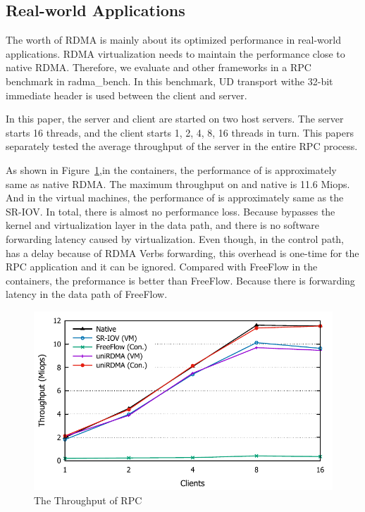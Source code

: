 \subsection{Real-world Applications}

The worth of RDMA is mainly about its optimized performance in real-world applications. RDMA virtualization needs to maintain the performance close to native RDMA. Therefore, we evaluate \sys and other frameworks in a RPC benchmark in radma\_bench\cite{rbench}. In this benchmark, UD transport withe 32-bit immediate header is used between the client and server.

In this paper, the server and client are started on two host servers. The server starts 16 threads, and the client starts 1, 2, 4, 8, 16 threads in turn. This papers separately tested the average throughput of the server in the entire RPC process.

As shown in Figure~\ref{fig:rpc},in the containers, the performance of \sys is approximately same as native RDMA. The
maximum throughput on \sys and native is 11.6 Miops. And in the virtual machines, the performance of \sys is approximately same as the SR-IOV. In total, there is almost no performance loss. Because \sys bypasses the kernel and virtualization layer in the data path, and there is no software forwarding latency caused by virtualization. Even though, in the control path, \sys has a delay because of RDMA Verbs forwarding, this overhead is one-time for the RPC application and it can be ignored. Compared with FreeFlow in the containers, the preformance \sys is better than FreeFlow. Because there is forwarding latency in the data path of FreeFlow.

\begin{figure}[!ht]
	\centering
	\includegraphics[width=1.0\linewidth]{images/rpc.pdf}
	\caption{The Throughput of RPC}
	\label{fig:rpc}
\end{figure}


